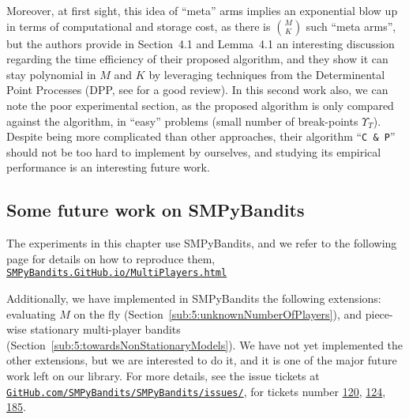 \indent
Moreover, at first sight, this idea of ``meta'' arms implies an exponential blow up in terms of computational and storage cost, as there is ${M \choose K}$ such ``meta arms'', but
the authors provide in Section~4.1 and Lemma~4.1 an interesting discussion regarding the time efficiency of their proposed algorithm, and they show it can stay polynomial in $M$ and $K$ by leveraging techniques from the Determinental Point Processes (DPP, see \cite{GaBaVa18} for a good review).
%
In this second work also, we can note the poor experimental section, as the proposed algorithm is only compared against the \MusicalChair{} algorithm, in ``easy'' problems (small number of break-points $\Upsilon_T$).
Despite being more complicated than other approaches, their algorithm ``\texttt{C \& P}'' should not be too hard to implement by ourselves, and studying its empirical performance is an interesting future work.






\subsection{Some future work on SMPyBandits}

The experiments in this chapter use SMPyBandits,
and we refer to the following page for details on how to reproduce them,
\href{https://SMPyBandits.GitHub.io/MultiPlayers.html}{\texttt{SMPyBandits.GitHub.io/MultiPlayers.html}}

Additionally, we have implemented in SMPyBandits \cite{SMPyBandits} the following extensions: evaluating $M$ on the fly (Section~\ref{sub:5:unknownNumberOfPlayers}), and piece-wise stationary multi-player bandits (Section~\ref{sub:5:towardsNonStationaryModels}).
We have not yet implemented the other extensions, but we are interested to do it, and it is one of the major future work left on our library.
For more details, see the issue tickets at \href{https://github.com/SMPyBandits/SMPyBandits/issues/}{\texttt{GitHub.com/SMPyBandits/SMPyBandits/issues/}}, for tickets number \href{https://github.com/SMPyBandits/SMPyBandits/issues/120}{120}, \href{https://github.com/SMPyBandits/SMPyBandits/issues/124}{124}, \href{https://github.com/SMPyBandits/SMPyBandits/issues/185}{185}.




